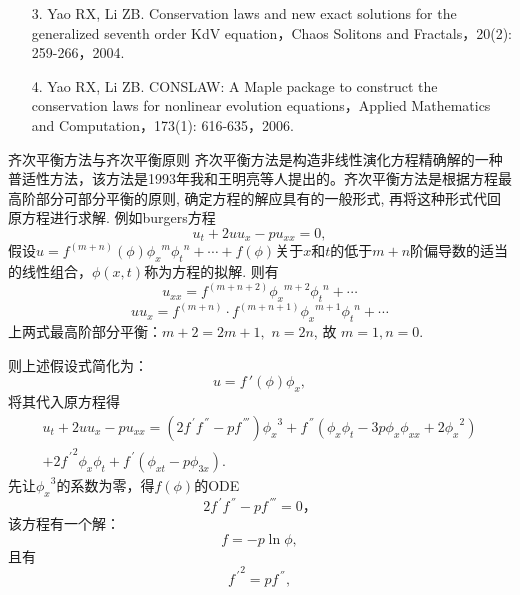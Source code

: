 \documentclass{beamer}
\begin{document}
\begin{frame}
 \begin{itemize}
  \item[3.] Yao RX, Li ZB. Conservation laws and new exact solutions for the generalized seventh order KdV equation，Chaos Solitons and Fractals，20(2): 259-266，2004.
  \item[4.] Yao RX, Li ZB. CONSLAW: A Maple package to construct the conservation laws for nonlinear evolution equations，Applied Mathematics and Computation，173(1): 616-635，2006.
 \end{itemize}
\end{frame}

\begin{frame}{齐次平衡方法与齐次平衡原则}
    齐次平衡方法是构造非线性演化方程精确解的一种普适性方法，该方法是1993年我和王明亮等人提出的。齐次平衡方法是根据方程最高阶部分可部分平衡的原则, 确定方程的解应具有的一般形式, 再将这种形式代回原方程进行求解. 
    例如burgers方程
    \[
      u_t+2uu_x-pu_{xx}=0,
    \]
   假设$u=f^{(m+n)}(\phi){\phi_x}^m{\phi_t}^n+\cdots+f(\phi)$关于$x$和$t$的低于$m+n$阶偏导数的适当的线性组合，$\phi(x,t)$称为方程的拟解. 则有
   \[
     u_{xx}= f^{(m+n+2)}{\phi_x}^{m+2}{\phi_t}^n+\cdots     
  \]
    \[
  uu_x=f^{(m+n)}\cdot f^{(m+n+1)}{\phi_x}^{m+1}{\phi_t}^n +\cdots  
  \]
  上两式最高阶部分平衡：$m+2=2m+1,\,\, n=2n$, 故 $m=1,n=0$.
  \end{frame}
  \begin{frame}
  则上述假设式简化为：
  \begin{equation}\label{u_f}
    u=f\,'(\phi){\phi_x},
  \end{equation}
  将其代入原方程得
  \begin{equation}\label{eq1}
    \begin{array}{ll}
   u_t+2uu_x-pu_{xx}=(2f^{\,'}f^{\,''}-pf^{\,'''}) {\phi_x}^3+f^{\,''}(\phi_x\phi_t-3p\phi_x\phi_{xx}+2{\phi_x}^2)\\[2mm]+2{f^{\,'}}^2\phi_x\phi_t+f^{\,'}(\phi_{xt}-p\phi_{3x}).
    \end{array}
  \end{equation}
  先让${\phi_x}^3$的系数为零，得$f(\phi)$的ODE
  \[
    2f^{\,'}f^{\,''}-pf^{\,'''} =0，
  \]
  该方程有一个解：
  \begin{equation}\label{sol1}
   f=-p\ln\phi, 
  \end{equation}
  且有 
  \[
   {f^{\,'}}^2=pf^{\,''},
  \]
  \end{frame}
\end{document}
